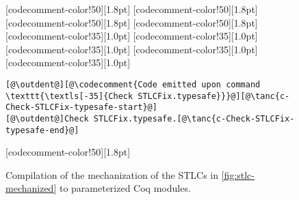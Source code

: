 \begin{figure}
\begin{minipage}{\textwidth}
\begin{multicols}{2}
[codecomment-color!50][1.8pt]
[codecomment-color!50][1.8pt]
[codecomment-color!50][1.8pt]
[codecomment-color!50][1.8pt]
[codecomment-color!35][1.0pt]
[codecomment-color!35][1.0pt]
[codecomment-color!35][1.0pt]
[codecomment-color!35][1.0pt]
[codecomment-color!35][1.0pt]

\vspace{-12pt}


\begin{lstlisting}
[@\outdent@][@\codecomment{Code emitted upon command \texttt{\textls[-35]{Check STLCFix.typesafe}}}@][@\tanc{c-Check-STLCFix-typesafe-start}@]
[@\outdent@]Check STLCFix.typesafe.[@\tanc{c-Check-STLCFix-typesafe-end}@]
\end{lstlisting}

[codecomment-color!50][1.8pt]

\end{multicols}
\end{minipage}


\caption{Compilation of the mechanization of the STLCs in \cref{fig:stlc-mechanized} to parameterized Coq modules.}
\label{fig:stlc-compiled}
\end{figure}